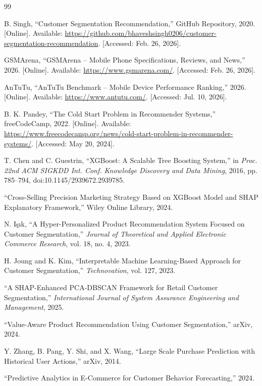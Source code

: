 \documentclass[12pt, a4paper]{report}
\numberwithin{figure}{chapter}
\numberwithin{table}{chapter}
\numberwithin{equation}{chapter}
\begin{document}
\begin{thebibliography}{99}

B. Singh, ``Customer Segmentation Recommendation,'' GitHub Repository, 2020. [Online]. Available: \url{https://github.com/bhaveshsingh0206/customer-segmentation-recommendation}. [Accessed: Feb. 26, 2026].

GSMArena, ``GSMArena -- Mobile Phone Specifications, Reviews, and News,'' 2026. [Online]. Available: \url{https://www.gsmarena.com/}. [Accessed: Feb. 26, 2026].

AnTuTu, ``AnTuTu Benchmark -- Mobile Device Performance Ranking,'' 2026. [Online]. Available: \url{https://www.antutu.com/}. [Accessed: Jul. 10, 2026].

B. K. Pandey, ``The Cold Start Problem in Recommender Systems,'' freeCodeCamp, 2022. [Online]. Available: \url{https://www.freecodecamp.org/news/cold-start-problem-in-recommender-systems/}. [Accessed: May 20, 2024].

T. Chen and C. Guestrin, ``XGBoost: A Scalable Tree Boosting System,'' in \emph{Proc. 22nd ACM SIGKDD Int. Conf. Knowledge Discovery and Data Mining}, 2016, pp. 785--794, doi:10.1145/2939672.2939785.

``Cross-Selling Precision Marketing Strategy Based on XGBoost Model and SHAP Explanatory Framework,'' Wiley Online Library, 2024.

N. I\c{s}\i k, ``A Hyper-Personalized Product Recommendation System Focused on Customer Segmentation,'' \emph{Journal of Theoretical and Applied Electronic Commerce Research}, vol. 18, no. 4, 2023.

H. Joung and K. Kim, ``Interpretable Machine Learning-Based Approach for Customer Segmentation,'' \emph{Technovation}, vol. 127, 2023.

``A SHAP-Enhanced PCA-DBSCAN Framework for Retail Customer Segmentation,'' \emph{International Journal of System Assurance Engineering and Management}, 2025.

``Value-Aware Product Recommendation Using Customer Segmentation,'' arXiv, 2024.

Y. Zhang, B. Pang, Y. Shi, and X. Wang, ``Large Scale Purchase Prediction with Historical User Actions,'' arXiv, 2014.

``Predictive Analytics in E-Commerce for Customer Behavior Forecasting,'' 2024.


\end{thebibliography}
\end{document}
